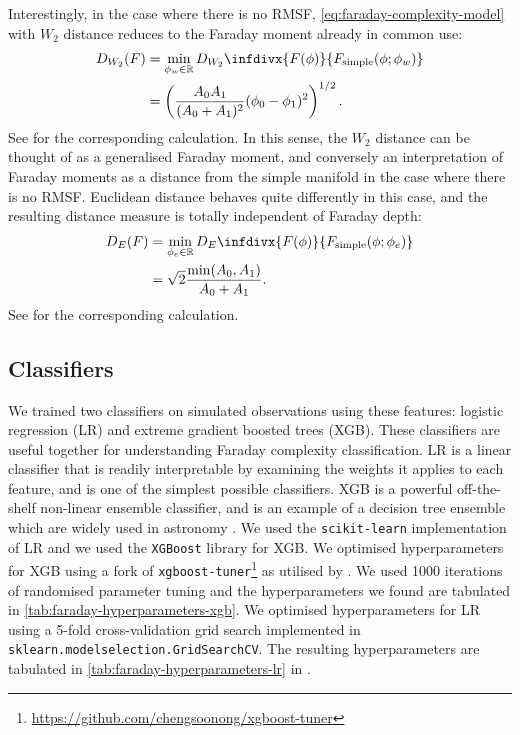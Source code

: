     Interestingly, in the case where there is no RMSF, \autoref{eq:faraday-complexity-model} with $W_2$ distance reduces to the Faraday moment already in common use:
    \begin{align}
        D_{W_2}(F) &= \min_{\phi_w \in \mathbb{R}} D_{W_2}\infdivx{F(\phi)}{F_{\mathrm{simple}}(\phi; \phi_w)}\label{eq:faraday-W2-distance}\\
            &= \left(\frac{A_0A_1}{(A_0 + A_1)^2} (\phi_0 - \phi_1)^2\right)^{1/2}.
    \end{align}
    See  for the corresponding calculation. In this sense, the $W_2$ distance can be thought of as a generalised Faraday moment, and conversely an interpretation of Faraday moments as a distance from the simple manifold in the case where there is no RMSF. Euclidean distance behaves quite differently in this case, and the resulting distance measure is totally independent of Faraday depth:
    \begin{align}
        D_{E}(F) &= \min_{\phi_e \in \mathbb{R}} D_E\infdivx{F(\phi)}{F_{\mathrm{simple}}(\phi; \phi_e)}\label{eq:faraday-Euclidean-distance}\\
            &= \sqrt{2} \frac{\min(A_0, A_1)}{A_0 + A_1}.
    \end{align}
    See  for the corresponding calculation.


  \subsection{Classifiers}
  \label{sec:faraday-classifiers}

    We trained two classifiers on simulated observations using these features: logistic regression (LR) and extreme gradient boosted trees (XGB). These classifiers are useful together for understanding Faraday complexity classification. LR is a linear classifier that is readily interpretable by examining the weights it applies to each feature, and is one of the simplest possible classifiers. XGB is a powerful off-the-shelf non-linear ensemble classifier, and is an example of a decision tree ensemble which are widely used in astronomy \citep[e.g.][]{machado_poletti_valle_shaping_2020,hlozek20lsst}. We used the \texttt{scikit-learn} implementation of LR and we used the \texttt{XGBoost} library for XGB. We optimised hyperparameters for XGB using a fork of \texttt{xgboost-tuner}\footnote{\url{https://github.com/chengsoonong/xgboost-tuner}} as utilised by \citet{zhu20mutagenic}. We used 1000 iterations of randomised parameter tuning and the hyperparameters we found are tabulated in \autoref{tab:faraday-hyperparameters-xgb}. We optimised hyperparameters for LR using a 5-fold cross-validation grid search implemented in \texttt{sklearn.model\textunderscore{}selection.GridSearchCV}. The resulting hyperparameters are tabulated in \autoref{tab:faraday-hyperparameters-lr} in .

